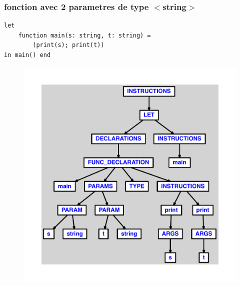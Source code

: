 \documentclass{article}
\begin{document}
\subsubsection{fonction avec 2 parametres de type $ < $string$ > $}
\begin{lstlisting}
let
	function main(s: string, t: string) =
		(print(s); print(t))
in main() end
\end{lstlisting}
\newpage
\begin{figure}[H]
\centering
\includegraphics[max width=\textwidth]{ast/ast_241.pdf}
\end{figure}
\newpage
\end{document}
